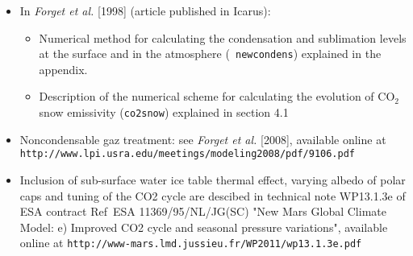 \begin{itemize}
\item In {\it Forget et al.} [1998] (article published in Icarus):
 \begin{itemize}
  \item Numerical method for calculating the condensation and sublimation levels
at the surface and in the atmosphere (\verb+ newcondens+)
 explained in the appendix.
  \item Description of the numerical scheme for calculating the evolution of CO$_2$
snow emissivity (\verb+co2snow+) explained in section 4.1
  \end{itemize}
\nocite{Forg:98}
\item Noncondensable gaz treatment: see {\it Forget et al.} [2008],
available online at
\verb+http://www.lpi.usra.edu/meetings/modeling2008/pdf/9106.pdf+
\item Inclusion of sub-surface water ice table thermal effect, varying albedo
of polar caps and tuning of the CO2 cycle are descibed in technical note
WP13.1.3e of ESA contract
Ref~ESA 11369/95/NL/JG(SC) "New Mars Global Climate Model:
e) Improved CO2 cycle and seasonal pressure variations", available online at
\verb+http://www-mars.lmd.jussieu.fr/WP2011/wp13.1.3e.pdf+
\end{itemize}


